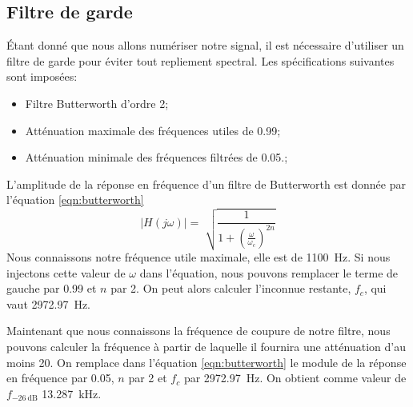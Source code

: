\subsection{Filtre de garde}
\label{Filtre de garde}
Étant donné que nous allons numériser notre signal, il est nécessaire d'utiliser un filtre de garde pour éviter tout repliement spectral. Les spécifications suivantes sont imposées:
\begin{itemize}
\item Filtre Butterworth d'ordre 2;
\item Atténuation maximale des fréquences utiles de 0.99;
\item Atténuation minimale des fréquences filtrées de 0.05.;
\end{itemize}
L'amplitude de la réponse en fréquence d'un filtre de Butterworth est donnée par l'équation \ref{eqn:butterworth}
\begin{equation}
\vert{H(j\omega)}\vert = \sqrt[]{\frac{1}{1+(\frac{\omega}{\omega_c})^{2n}}}
\label{eqn:butterworth}
\end{equation}
Nous connaissons notre fréquence utile maximale, elle est de \SI{1100}{\hertz}. Si nous injectons cette valeur de $\omega$ dans l'équation, nous pouvons remplacer le terme de gauche par 0.99 et $n$ par 2. On peut alors calculer  l'inconnue restante, $f_c$, qui vaut \SI{2972.97}{\hertz}.

Maintenant que nous connaissons la fréquence de coupure de notre filtre, nous pouvons calculer la fréquence à partir de laquelle il fournira une atténuation d'au moins 20. On remplace dans l'équation \ref{eqn:butterworth} le module de la réponse en fréquence par 0.05, $n$ par 2 et $f_c$ par \SI{2972.97}{\hertz}. On obtient comme valeur de $f_{\SI{-26}{\deci\bel}}$ \SI{13.287}{\kilo\hertz}.

